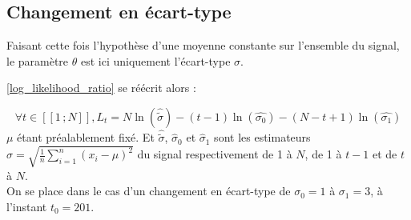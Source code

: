 \documentclass[french,11pt,notitlepage]{report}
\begin{document}
	
	\subsection{Changement en écart-type}
	
	
	Faisant cette fois l'hypothèse d'une moyenne constante sur l'ensemble du signal, le paramètre $\theta$ est ici uniquement l'écart-type $\sigma$.
	
	\ref{log_likelihood_ratio} se réécrit alors : 
	
	\begin{equation}
		\forall t \in [\![1\,; N]\!], L_t = N\ln (\hat{\tilde\sigma}) - (t-1)\ln (\hat{\sigma_0}) - (N-t+1)\ln (\hat{\sigma_1})
		\label{stdchange}
	\end{equation}
	$\mu$ étant préalablement fixé. Et $\hat{\tilde\sigma}$, $\hat\sigma_0$ et $\hat\sigma_1$ sont les estimateurs $\hat\sigma=\sqrt{\frac1n\sum_{i=1}^n(x_i-\mu)^2}$ du signal respectivement de 1 à $N$, de 1 à $t-1$ et de $t$ à $N$.
	\\
	
		On se place dans le cas d'un changement en écart-type de $\sigma_0 = 1$ à $\sigma_1 = 3$, à l'instant $t_0 = 201$.
	
\end{document}
